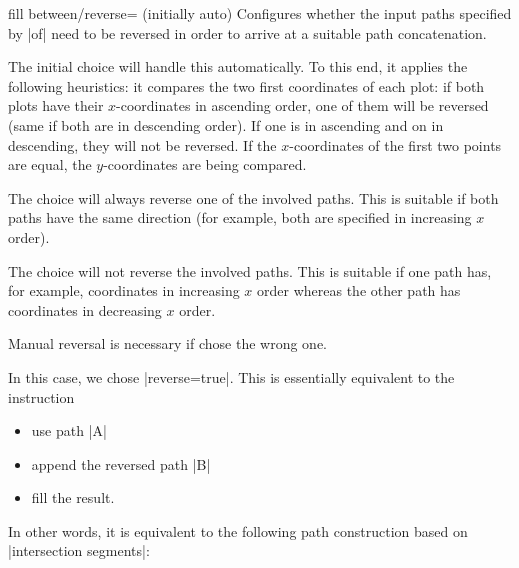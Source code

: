 \begin{tikzkey}{fill between/reverse= (initially auto)}
    Configures whether the input paths specified by |of| need to be reversed in
    order to arrive at a suitable path concatenation.

    The initial choice  will handle this automatically. To
    this end, it applies the following heuristics: it compares the two first
    coordinates of each plot: if both plots have their $x$-coordinates in
    ascending order, one of them will be reversed (same if both are in
    descending order). If one is in ascending and on in descending, they will
    not be reversed. If the $x$-coordinates of the first two points are equal,
    the $y$-coordinates are being compared.

    The choice  will always reverse one of the involved
    paths. This is suitable if both paths have the same direction (for example,
    both are specified in increasing $x$ order).

    The choice  will not reverse the involved paths. This is
    suitable if one path has, for example, coordinates in increasing $x$ order
    whereas the other path has coordinates in decreasing $x$ order.

    Manual reversal is necessary if \PGFPlots{} chose the wrong one.
\begin{codeexample}[]
\end{codeexample}
    In this case, we chose |reverse=true|. This is essentially equivalent to
    the instruction
    \begin{itemize}
        \item use path |A|
        \item append the reversed path |B|
        \item fill the result.
    \end{itemize}
    In other words, it is equivalent to the following path construction based
    on |intersection segments|:
\begin{codeexample}[]
\end{codeexample}
\end{tikzkey}
